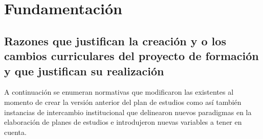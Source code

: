 \documentclass[a4paper, 12pt]{article}
\begin{document}
\section{Fundamentación}

\subsection{Razones que justifican la creación y o los cambios curriculares del proyecto de formación  y que justifican su realización}

A continuación se enumeran normativas que modificaron las existentes al momento de crear la versión anterior del plan de estudios como así también instancias de intercambio institucional que delinearon nuevos paradigmas en la elaboración de planes de estudios e introdujeron nuevas variables a tener en cuenta.
\end{document}
